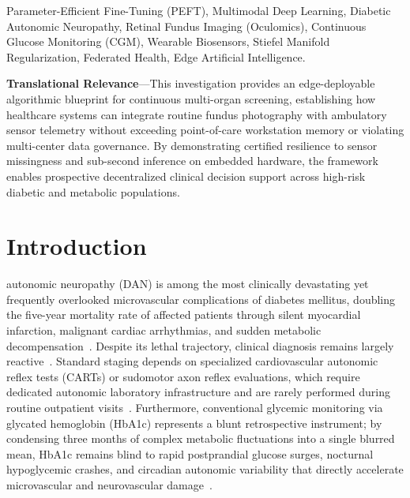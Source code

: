 \documentclass[journal,10pt,twocolumn]{IEEEtran}
\begin{document}
\begin{IEEEkeywords}
Parameter-Efficient Fine-Tuning (PEFT), Multimodal Deep Learning, Diabetic Autonomic Neuropathy, Retinal Fundus Imaging (Oculomics), Continuous Glucose Monitoring (CGM), Wearable Biosensors, Stiefel Manifold Regularization, Federated Health, Edge Artificial Intelligence.
\end{IEEEkeywords}

\vspace{0.8ex}
\noindent\small\textbf{Translational Relevance}---This investigation provides an edge-deployable algorithmic blueprint for continuous multi-organ screening, establishing how healthcare systems can integrate routine fundus photography with ambulatory sensor telemetry without exceeding point-of-care workstation memory or violating multi-center data governance. By demonstrating certified resilience to sensor missingness and sub-second inference on embedded hardware, the framework enables prospective decentralized clinical decision support across high-risk diabetic and metabolic populations.\normalsize\vspace{0.8ex}

\IEEEpeerreviewmaketitle

\section{Introduction}
\label{sec:intro}
 autonomic neuropathy (DAN) is among the most clinically devastating yet frequently overlooked microvascular complications of diabetes mellitus, doubling the five-year mortality rate of affected patients through silent myocardial infarction, malignant cardiac arrhythmias, and sudden metabolic decompensation~\cite{vinik2003diabetic,tesfaye2010diabetic,maser2003association}. Despite its lethal trajectory, clinical diagnosis remains largely reactive~\cite{spallone2011cardiovascular}. Standard staging depends on specialized cardiovascular autonomic reflex tests (CARTs) or sudomotor axon reflex evaluations, which require dedicated autonomic laboratory infrastructure and are rarely performed during routine outpatient visits~\cite{boulton2005diabetic}. Furthermore, conventional glycemic monitoring via glycated hemoglobin (HbA1c) represents a blunt retrospective instrument; by condensing three months of complex metabolic fluctuations into a single blurred mean, HbA1c remains blind to rapid postprandial glucose surges, nocturnal hypoglycemic crashes, and circadian autonomic variability that directly accelerate microvascular and neurovascular damage~\cite{danne2017international,battelino2023continuous}.
\end{document}
